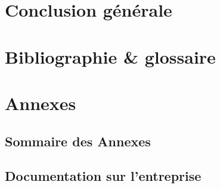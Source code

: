 \documentclass[a4paper, 11pt]{report}
\begin{document}
\chapter{Conclusion générale}
\chapter{Bibliographie \& glossaire}
\chapter{Annexes}
  \section{Sommaire des Annexes}
  \section{Documentation sur l'entreprise}
\end{document}
